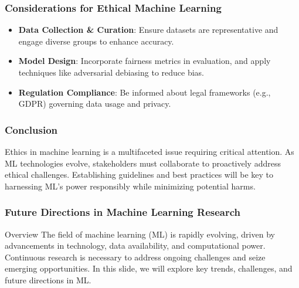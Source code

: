 \documentclass[aspectratio=169]{beamer}
\begin{document}
\begin{frame}[fragile]
    \frametitle{Considerations for Ethical Machine Learning}
    \begin{itemize}
        \item \textbf{Data Collection \& Curation}: Ensure datasets are representative and engage diverse groups to enhance accuracy.
        \item \textbf{Model Design}: Incorporate fairness metrics in evaluation, and apply techniques like adversarial debiasing to reduce bias.
        \item \textbf{Regulation Compliance}: Be informed about legal frameworks (e.g., GDPR) governing data usage and privacy.
    \end{itemize}
\end{frame}

\begin{frame}[fragile]
    \frametitle{Conclusion}
    Ethics in machine learning is a multifaceted issue requiring critical attention. As ML technologies evolve, stakeholders must collaborate to proactively address ethical challenges. Establishing guidelines and best practices will be key to harnessing ML's power responsibly while minimizing potential harms.
\end{frame}

\begin{frame}[fragile]
    \frametitle{Future Directions in Machine Learning Research}
    \begin{block}{Overview}
        The field of machine learning (ML) is rapidly evolving, driven by advancements in technology, data availability, and computational power. Continuous research is necessary to address ongoing challenges and seize emerging opportunities. In this slide, we will explore key trends, challenges, and future directions in ML.
    \end{block}
\end{frame}
\end{document}
